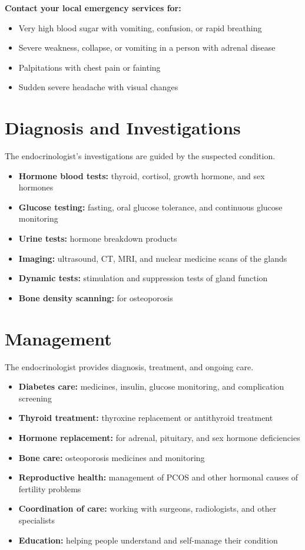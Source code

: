 \textbf{Contact your local emergency services for:}
\begin{itemize}
    \item Very high blood sugar with vomiting, confusion, or rapid breathing
    \item Severe weakness, collapse, or vomiting in a person with adrenal disease
    \item Palpitations with chest pain or fainting
    \item Sudden severe headache with visual changes
\end{itemize}

\section*{Diagnosis and Investigations}
The endocrinologist's investigations are guided by the suspected condition.
\begin{itemize}
    \item \textbf{Hormone blood tests:} thyroid, cortisol, growth hormone, and sex hormones
    \item \textbf{Glucose testing:} fasting, oral glucose tolerance, and continuous glucose monitoring
    \item \textbf{Urine tests:} hormone breakdown products
    \item \textbf{Imaging:} ultrasound, CT, MRI, and nuclear medicine scans of the glands
    \item \textbf{Dynamic tests:} stimulation and suppression tests of gland function
    \item \textbf{Bone density scanning:} for osteoporosis
\end{itemize}

\section*{Management}
The endocrinologist provides diagnosis, treatment, and ongoing care.
\begin{itemize}
    \item \textbf{Diabetes care:} medicines, insulin, glucose monitoring, and complication screening
    \item \textbf{Thyroid treatment:} thyroxine replacement or antithyroid treatment
    \item \textbf{Hormone replacement:} for adrenal, pituitary, and sex hormone deficiencies
    \item \textbf{Bone care:} osteoporosis medicines and monitoring
    \item \textbf{Reproductive health:} management of PCOS and other hormonal causes of fertility problems
    \item \textbf{Coordination of care:} working with surgeons, radiologists, and other specialists
    \item \textbf{Education:} helping people understand and self-manage their condition
\end{itemize}

